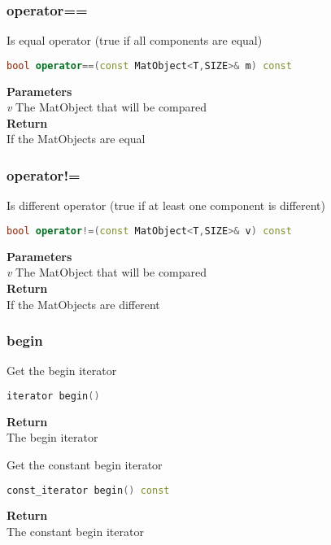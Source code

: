 \subsubsection{operator==}
\begin{mdframed}
Is equal operator (true if all components are equal)
\begin{lstlisting}[language=C++]
bool operator==(const MatObject<T,SIZE>& m) const
\end{lstlisting}
\textbf{Parameters} \\ 
\textit{v} The MatObject that will be compared \\ 
\textbf{Return} \\ 
If the MatObjects are equal\\ 
\end{mdframed}

\subsubsection{operator!=}
\begin{mdframed}
Is different operator (true if at least one component is different)
\begin{lstlisting}[language=C++]
bool operator!=(const MatObject<T,SIZE>& v) const
\end{lstlisting}
\textbf{Parameters} \\ 
\textit{v} The MatObject that will be compared \\ 
\textbf{Return} \\ 
If the MatObjects are different\\ 
\end{mdframed}

\subsubsection{begin}
\begin{mdframed}
Get the begin iterator
\begin{lstlisting}[language=C++]
iterator begin()
\end{lstlisting}
\textbf{Return} \\ 
The begin iterator\\ 
\end{mdframed}

\begin{mdframed}
Get the constant begin iterator
\begin{lstlisting}[language=C++]
const_iterator begin() const
\end{lstlisting}
\textbf{Return} \\ 
The constant begin iterator\\ 
\end{mdframed}

